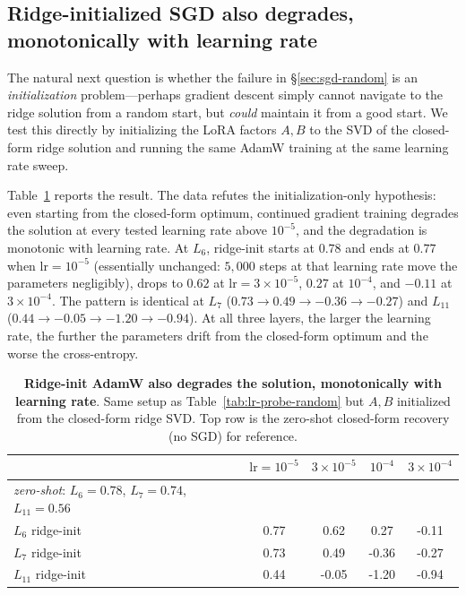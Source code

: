 \subsection{Ridge-initialized SGD also degrades, monotonically with learning rate}
\label{sec:sgd-ridge-init}

The natural next question is whether the failure in \S\ref{sec:sgd-random}
is an \emph{initialization} problem---perhaps gradient descent simply
cannot navigate to the ridge solution from a random start, but \emph{could}
maintain it from a good start. We test this directly by initializing the
LoRA factors $A, B$ to the SVD of the closed-form ridge solution and
running the same AdamW training at the same learning rate sweep.

Table~\ref{tab:lr-probe-ridge} reports the result. The data refutes the
initialization-only hypothesis: even starting from the closed-form optimum,
continued gradient training degrades the solution at every tested learning
rate above $10^{-5}$, and the degradation is monotonic with learning rate.
At $L_6$, ridge-init starts at $0.78$ and ends at $0.77$ when
$\mathrm{lr}{=}10^{-5}$ (essentially unchanged: $5{,}000$ steps at that
learning rate move the parameters negligibly), drops to $0.62$ at
$\mathrm{lr}{=}3{\times}10^{-5}$, $0.27$ at $10^{-4}$, and $-0.11$ at
$3{\times}10^{-4}$. The pattern is identical at $L_7$ ($0.73 \to 0.49 \to
-0.36 \to -0.27$) and $L_{11}$ ($0.44 \to -0.05 \to -1.20 \to -0.94$). At
all three layers, the larger the learning rate, the further the parameters
drift from the closed-form optimum and the worse the cross-entropy.

\begin{table}[t]
\centering\small
\caption{\textbf{Ridge-init AdamW also degrades the solution, monotonically
with learning rate}. Same setup as Table~\ref{tab:lr-probe-random} but
$A, B$ initialized from the closed-form ridge SVD. Top row is the
zero-shot closed-form recovery (no SGD) for reference.}
\label{tab:lr-probe-ridge}
\begin{tabular}{lcccc}
\toprule
 & $\mathrm{lr}{=}10^{-5}$ & $3{\times}10^{-5}$ & $10^{-4}$ & $3{\times}10^{-4}$ \\
\midrule
\textit{zero-shot}: $L_6{=}0.78$, $L_7{=}0.74$, $L_{11}{=}0.56$ & & & & \\
\midrule
$L_6$ ridge-init   &  0.77 &  0.62 &  0.27 & -0.11 \\
$L_7$ ridge-init   &  0.73 &  0.49 & -0.36 & -0.27 \\
$L_{11}$ ridge-init &  0.44 & -0.05 & -1.20 & -0.94 \\
\bottomrule
\end{tabular}
\end{table}

